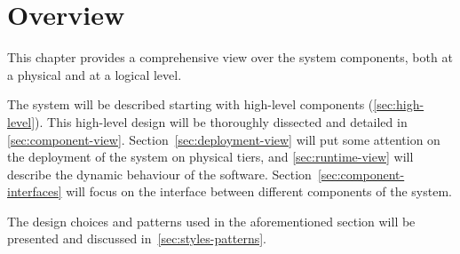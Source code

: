 \section{Overview}
\label{sec:overview}

This chapter provides a comprehensive view over the system components, both at a physical and at a logical level.

The system will be described starting with high-level components (\autoref{sec:high-level}). This high-level design will be thoroughly dissected and detailed in \autoref{sec:component-view}.
Section~\ref{sec:deployment-view} will put some attention on the deployment of the system on physical tiers, and \autoref{sec:runtime-view} will describe the dynamic behaviour of the software.
Section~\ref{sec:component-interfaces} will focus on the interface between different components of the system.

The design choices and patterns used in the aforementioned section will be presented and discussed in~\autoref{sec:styles-patterns}.
